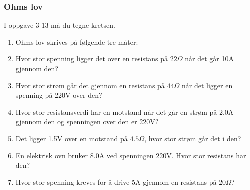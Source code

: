 \documentclass[12pt,a4paper]{article}
\begin{document}
\subsubsection{Ohms lov}

I oppgave 3-13 må du tegne kretsen. 
\begin{enumerate}
\item Ohms lov skrives på følgende tre måter:
\vskip 5pt 
\vskip 2.5pt 
\item Hvor stor spenning ligger det over en resistans på $22\Omega$ når det går 10A gjennom den?
\vskip 5pt 
\vskip 2.5pt 
\item Hvor stor strøm går det gjennom en resistans på $44\Omega$ når det ligger en spenning på 220V over den?
\vskip 5pt 
\vskip 2.5pt 
\item Hvor stor resistansverdi har en motstand når det går en strøm på 2.0A gjennom den og spenningen over den er 220V?
\vskip 5pt 
\vskip 2.5pt 
\item Det ligger 1.5V over en motstand på $4.5\Omega$, hvor stor strøm går det i den?
\vskip 5pt 
\vskip 2.5pt 
\item En elektrisk ovn bruker 8.0A ved spenningen 220V. Hvor stor resistans har den?
\vskip 5pt 
\vskip 2.5pt 
\item Hvor stor spenning kreves for å drive 5A gjennom en resistans på $20\Omega$? 
\vskip 5pt 
\vskip 2.5pt 

\end{enumerate}
\end{document}
